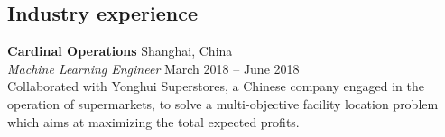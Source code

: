\documentclass[margin,line]{resume}
\begin{document}
\begin{resume}
       

       
         

         
 	  \section{\mysidestyle Industry experience} 

         \textbf{Cardinal Operations} \hfill Shanghai, China\\
         {\sl Machine Learning Engineer} \hfill March 2018 -- June 2018\\
         Collaborated with Yonghui Superstores, a Chinese company engaged in the operation of supermarkets, to solve a multi-objective facility location problem which aims at maximizing the total expected profits.\\
         


\end{resume}
\end{document}
